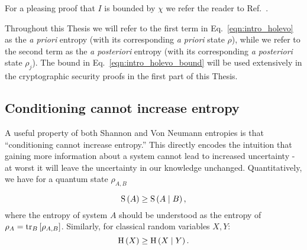 \noindent For a pleasing proof that $I$ is bounded by $\chi$ we refer the reader to Ref.~\cite{Nielsen2010}. 

Throughout this Thesis we will refer to the first term in Eq.~\ref{eqn:intro_holevo} as the \emph{a priori} entropy (with its corresponding \emph{a priori} state $\rho$), while we refer to the second term as the \emph{a  posteriori} entropy (with its corresponding \emph{a posteriori} state $\rho_j$). The bound in Eq.~\ref{eqn:intro_holevo_bound} will be used extensively in the cryptographic security proofs in the first part of this Thesis.


\FloatBarrier
\subsection{Conditioning cannot increase entropy}

A useful property of both Shannon and Von Neumann entropies is that ``conditioning cannot increase entropy.'' This directly encodes the intuition that gaining more information about a system cannot lead to increased uncertainty - at worst it will leave the uncertainty in our knowledge unchanged. Quantitatively, we have for a quantum state $\rho_{A, B}$

\begin{equation}
\text{S}\left(A\right) \ge \text{S}\left( A \; \middle| \; B \right),
\end{equation}
where the entropy of system $A$ should be understood as the entropy of $\rho_A = \tr_B\left[\rho_{A, B}\right]$. Similarly, for classical random variables $X, Y$:
\begin{equation}
\text{H}\left(X\right) \ge \text{H}\left(X \; \middle| \; Y\right).
\end{equation}








